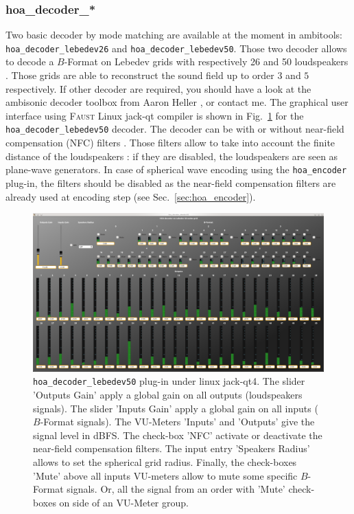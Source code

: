\documentclass[10pt,a4paper]{article}
\begin{document}
\pagebreak
\subsubsection{hoa\_decoder\_*}
\label{sec:hoa_decoder}
Two basic decoder by mode matching \cite{daniel2000representation,poletti2005three} are available at the moment in ambitools: \lstinline'hoa_decoder_lebedev26' and
\lstinline'hoa_decoder_lebedev50'. Those two decoder allows to decode a $B$-Format on Lebedev grids with respectively 26 and 50 loudspeakers \cite{lebedev1975values,lecomte2015on}. Those grids are able to reconstruct the sound field up to order $3$ and $5$ respectively.
If other decoder are required, you should have a look at the ambisonic decoder toolbox from Aaron Heller \cite{heller2012toolkit}, or contact me. The graphical user interface using \textsc{Faust} Linux jack-qt compiler is shown in Fig.~\ref{fig:hoa_decoder_lebedev50} for the \lstinline'hoa_decoder_lebedev50' decoder. The decoder can be with or without near-field compensation (NFC) filters \cite{daniel2003further,lecomte2015real}. Those filters allow to take into account the finite distance of the loudspeakers : if they are disabled, the loudspeakers are seen as plane-wave generators. In case of spherical wave encoding using the \lstinline'hoa_encoder' plug-in, the filters should be disabled as the near-field compensation filters are already used at encoding step (see Sec.~\ref{sec:hoa_encoder}).
\begin{figure}[!ht]
\includegraphics[width=\columnwidth]{hoa_decoder_lebedev50.png}
\caption{\lstinline'hoa_decoder_lebedev50' plug-in under linux jack-qt4. The slider 'Outputs Gain' apply a global gain on all outputs (loudspeakers signals). The slider 'Inputs Gain' apply a global gain on all inputs ($B$-Format signals). The VU-Meters 'Inputs' and 'Outputs' give the signal level in dBFS. The check-box 'NFC' activate or deactivate the near-field compensation filters. The input entry 'Speakers Radius' allows to set the spherical grid radius. Finally, the check-boxes 'Mute' above all inputs VU-meters allow to mute some specific $B$-Format signals. Or, all the signal from an order with 'Mute' check-boxes on side of an VU-Meter group.}
\label{fig:hoa_decoder_lebedev50}
\end{figure}
\end{document}

